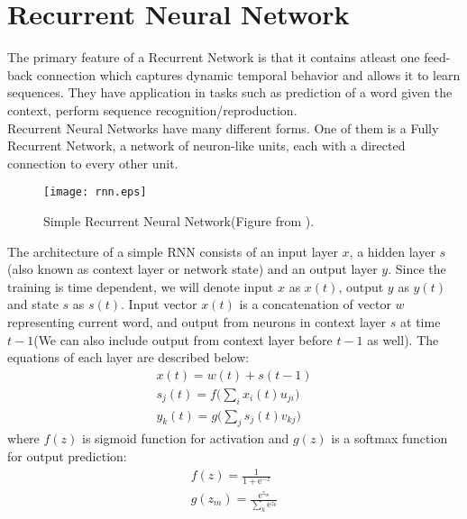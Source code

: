 \section{Recurrent Neural Network}
\label{sec:rnn}
The primary feature of a Recurrent Network is that it contains atleast one feed-back connection which captures dynamic temporal behavior and allows it to learn sequences. They have application in tasks such as prediction of a word given the context, perform sequence recognition/reproduction.\\
Recurrent Neural Networks have many different forms. One of them is a Fully Recurrent Network, a network of neuron-like units, each with a directed connection to every other unit.\\
\begin{figure}[ht!]
\centering
\texttt{[image: rnn.eps]}
\caption{Simple Recurrent Neural Network(Figure from \cite{Mikolov:10}). \label{fig:rnn}}
\end{figure}

The architecture of a simple RNN consists of an input layer $x$, a hidden layer $s$(also known as context layer or network state) and an output layer $y$. Since the training is time dependent, we will denote input $x$ as $x(t)$, output $y$ as $y(t)$ and state $s$ as $s(t)$. Input vector $x(t)$ is a concatenation of vector $w$ representing current word, and output from neurons in context layer $s$ at time $t-1$(We can also include output from context layer before $t-1$ as well). The equations of each layer are described below:
\begin{align}
x(t) = w(t) + s(t-1) \\
s_j(t) = f\bigg(\sum_{i}x_i(t)u_{ji}\bigg) \\
y_k(t) = g\bigg(\sum_{j}s_j(t)v_{kj}\bigg)
\end{align}
where $f(z)$ is sigmoid function for activation and $g(z)$ is a softmax function for output prediction:
\begin{align}
f(z) = \frac{1}{1+\mathrm{e}^{-z}} \\
g(z_m) = \frac{\mathrm{e}^{z_m}}{\sum_{k}\mathrm{e}^{z_k}}
\end{align}

